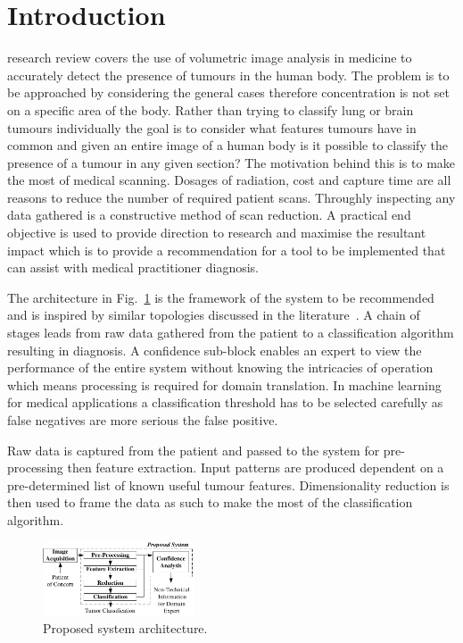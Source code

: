 \documentclass[journal]{IEEEtran}
\begin{document}
\section{Introduction}
 research review covers the use of volumetric image analysis in medicine to accurately detect the presence of tumours in the human body. 
The problem is to be approached by considering the general cases therefore concentration is not set on a specific area of the body.
Rather than trying to classify lung or brain tumours individually the goal is to consider what features tumours have in common and given an entire image of a human body is it possible to classify the presence of a tumour in any given section?
The motivation behind this is to make the most of medical scanning.
Dosages of radiation, cost and capture time are all reasons to reduce the number of required patient scans.
Throughly inspecting any data gathered is a constructive method of scan reduction.
A practical end objective is used to provide direction to research and maximise the resultant impact which is to provide a recommendation for a tool to be implemented that can assist with medical practitioner diagnosis.  

The architecture in Fig.~\ref{fig:Proposed} is the framework of the system to be recommended and is inspired by similar topologies discussed in the literature~\cite{ahmed2011efficacy,kumar2011classification,hau07feat,sachdeva2011multiclass,kostis03three}.
A chain of stages leads from raw data gathered from the patient to a classification algorithm resulting in diagnosis.
A confidence sub-block enables an expert to view the performance of the entire system without knowing the intricacies of operation which means processing is required for domain translation.
In machine learning for medical applications a classification threshold has to be selected carefully as false negatives are more serious the false positive.

Raw data is captured from the patient and passed to the system for pre-processing then feature extraction.
Input patterns are produced dependent on a pre-determined list of known useful tumour features. 
Dimensionality reduction is then used to frame the data as such to make the most of the classification algorithm.

\begin{figure}[!htb]
   \centering
   \includegraphics[width = 0.4\textwidth]{Figures/Proposed.pdf}
   \caption{Proposed system architecture.}
   \label{fig:Proposed}
\end{figure}
\end{document}
